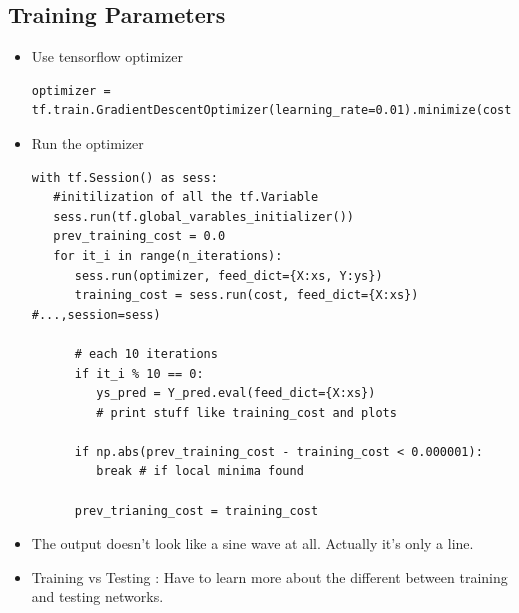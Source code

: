 \documentclass[12pt,a4paper]{article}
\begin{document}
\subsection{Training Parameters}
\begin{itemize}
\item Use tensorflow optimizer 
\begin{lstlisting}
optimizer = tf.train.GradientDescentOptimizer(learning_rate=0.01).minimize(cost)
\end{lstlisting}
\item Run the optimizer
\begin{lstlisting}
with tf.Session() as sess:
   #initilization of all the tf.Variable
   sess.run(tf.global_varables_initializer())
   prev_training_cost = 0.0
   for it_i in range(n_iterations):
      sess.run(optimizer, feed_dict={X:xs, Y:ys})
      training_cost = sess.run(cost, feed_dict={X:xs}) #...,session=sess)
      
      # each 10 iterations
      if it_i % 10 == 0:
         ys_pred = Y_pred.eval(feed_dict={X:xs})
         # print stuff like training_cost and plots
      
      if np.abs(prev_training_cost - training_cost < 0.000001):
         break # if local minima found
        
      prev_trianing_cost = training_cost
\end{lstlisting}
\item The output doesn't look like a sine wave at all. Actually it's only a line.
\item Training vs Testing : Have to learn more about the different between training and testing networks.
\end{itemize}
\end{document}
